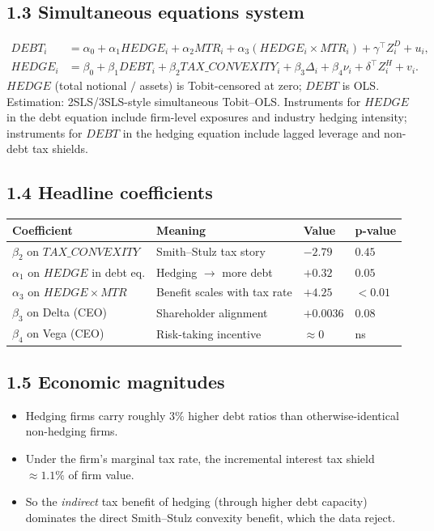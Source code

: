\documentclass[11pt]{article}
\begin{document}
\subsection*{1.3 Simultaneous equations system}
\begin{align*}
DEBT_i &= \alpha_0 + \alpha_1 HEDGE_i + \alpha_2 MTR_i + \alpha_3 (HEDGE_i\times MTR_i) + \gamma^\top Z_i^{D} + u_i, \\
HEDGE_i &= \beta_0 + \beta_1 DEBT_i + \beta_2 TAX\_CONVEXITY_i + \beta_3 \Delta_i + \beta_4 \nu_i + \delta^\top Z_i^{H} + v_i.
\end{align*}
$HEDGE$ (total notional $/$ assets) is Tobit-censored at zero; $DEBT$ is OLS. Estimation: 2SLS/3SLS-style simultaneous Tobit--OLS. Instruments for $HEDGE$ in the debt equation include firm-level exposures and industry hedging intensity; instruments for $DEBT$ in the hedging equation include lagged leverage and non-debt tax shields.

\subsection*{1.4 Headline coefficients}
\begin{tabular}{p{5.8cm}p{3.5cm}p{2cm}p{1.8cm}}
\toprule
\textbf{Coefficient} & \textbf{Meaning} & \textbf{Value} & \textbf{p-value} \\
\midrule
$\beta_2$ on $TAX\_CONVEXITY$ & Smith--Stulz tax story & $-2.79$ & $0.45$ \\
$\alpha_1$ on $HEDGE$ in debt eq. & Hedging $\to$ more debt & $+0.32$ & $0.05$ \\
$\alpha_3$ on $HEDGE \times MTR$ & Benefit scales with tax rate & $+4.25$ & $<0.01$ \\
$\beta_3$ on Delta (CEO) & Shareholder alignment & $+0.0036$ & $0.08$ \\
$\beta_4$ on Vega (CEO) & Risk-taking incentive & $\approx 0$ & ns \\
\bottomrule
\end{tabular}

\subsection*{1.5 Economic magnitudes}
\begin{itemize}
\item Hedging firms carry roughly $3\%$ higher debt ratios than otherwise-identical non-hedging firms.
\item Under the firm's marginal tax rate, the incremental interest tax shield $\approx 1.1\%$ of firm value.
\item So the \emph{indirect} tax benefit of hedging (through higher debt capacity) dominates the direct Smith--Stulz convexity benefit, which the data reject.
\end{itemize}
\end{document}
